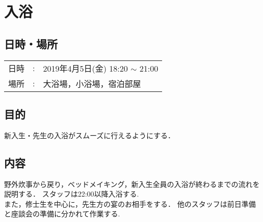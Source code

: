 %
\section{入浴}


\subsection{日時・場所}
\begin{tabular}{p{}rp{}}
  日時 & : & 2019年4月5日(金) 18:20 $\sim$ 21:00\\
  場所 & : & 大浴場，小浴場，宿泊部屋
\end{tabular}


\subsection{目的}
新入生・先生の入浴がスムーズに行えるようにする．

\subsection{内容}
野外炊事から戻り，ベッドメイキング，新入生全員の入浴が終わるまでの流れを説明する．
スタッフは22:00以降入浴する. \\
また，修士生を中心に，先生方の宴のお相手をする．
他のスタッフは前日準備と座談会の準備に分かれて作業する.

